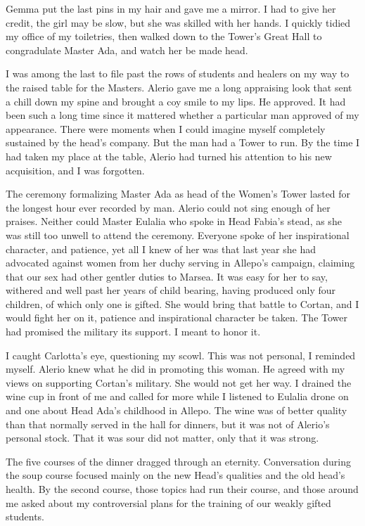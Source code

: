 \documentclass{article}
\begin{document}
Gemma put the last pins in my hair and gave me a mirror. I had to give her credit, the girl may be slow, but she was skilled with her hands. I quickly tidied my office of my toiletries, then walked down to the Tower's Great Hall to congradulate Master Ada, and watch her be made head. 

I was among the last  to file past the rows of students and healers on my way to the raised table for the Masters. Alerio gave me a long appraising look that sent a chill down my spine and brought a coy smile to my lips. He approved. It had been such a long time since it mattered whether a particular man approved of my appearance. There were moments when I could imagine myself completely sustained by the head's company. But the man had a Tower to run. By the time I had taken my place at the table, Alerio had turned his attention to his new acquisition, and I was forgotten. 

The ceremony formalizing Master Ada as head of the Women's Tower lasted for the longest hour ever recorded by man. Alerio could not sing enough of her praises. Neither could Master Eulalia who spoke in Head Fabia's stead, as she was still too unwell to attend the ceremony. Everyone spoke of her inspirational character, and patience, yet all I knew of her was that last year she had advocated against women from her duchy serving in Allepo's campaign, claiming that our sex had other gentler duties to Marsea. It was easy for her to say, withered and well past her years of child bearing, having produced only four children, of which only one is gifted. She would bring that battle to Cortan, and I would fight her on it, patience and inspirational character be taken. The Tower had promised the military its support. I meant to honor it. 

I caught Carlotta's eye, questioning my scowl. This was not personal, I reminded myself. Alerio knew what he did in promoting this woman. He agreed with my views on supporting Cortan's military. She would not get her way. I drained the wine cup in front of me and called for more while I listened to Eulalia drone on and one about Head Ada's childhood in Allepo. The wine was of better quality than that normally served in the hall for dinners, but it was not of Alerio's personal stock. That it was sour did not matter, only that it was strong.

The five courses of the dinner dragged through an eternity. Conversation during the soup course focused mainly on the new Head's qualities and the old head's health. By the second course, those topics had run their course, and those around me asked about my controversial plans for the training of our weakly gifted students.
\end{document}
